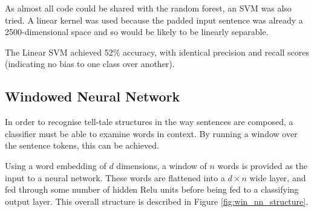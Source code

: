 As almost all code could be shared with the random forest, an SVM was also
tried. A linear kernel was used because the padded input sentence was already a
2500-dimensional space and so would be likely to be linearly separable.

The Linear SVM achieved 52\% accuracy, with identical precision and recall
scores (indicating no bias to one class over another).

\subsection{Windowed Neural Network}
\label{sec:win_nn}
In order to recognise tell-tale structures in the way sentences are composed, a classifier must be able to examine words in context. By running a window over the sentence tokens, this can be achieved.

Using a word embedding of $d$ dimensions, a window of $n$ words is provided as the input to a neural network. These words are flattened into a $d \times n$ wide layer, and fed through some number of hidden Relu units before being fed to a classifying output layer. This overall structure is described in Figure \ref{fig:win_nn_structure}.

